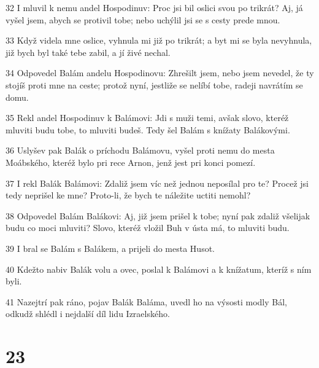 \par 32 I mluvil k nemu andel Hospodinuv: Proc jsi bil oslici svou po trikrát? Aj, já vyšel jsem, abych se protivil tobe; nebo uchýlil jsi se s cesty prede mnou.
\par 33 Když videla mne oslice, vyhnula mi již po trikrát; a byt mi se byla nevyhnula, již bych byl také tebe zabil, a jí živé nechal.
\par 34 Odpovedel Balám andelu Hospodinovu: Zhrešilt jsem, nebo jsem nevedel, že ty stojíš proti mne na ceste; protož nyní, jestliže se nelíbí tobe, radeji navrátím se domu.
\par 35 Rekl andel Hospodinuv k Balámovi: Jdi s muži temi, avšak slovo, kteréž mluviti budu tobe, to mluviti budeš. Tedy šel Balám s knížaty Balákovými.
\par 36 Uslyšev pak Balák o príchodu Balámovu, vyšel proti nemu do mesta Moábského, kteréž bylo pri rece Arnon, jenž jest pri konci pomezí.
\par 37 I rekl Balák Balámovi: Zdaliž jsem víc než jednou neposílal pro te? Procež jsi tedy neprišel ke mne? Proto-li, že bych te náležite uctiti nemohl?
\par 38 Odpovedel Balám Balákovi: Aj, již jsem prišel k tobe; nyní pak zdaliž všelijak budu co moci mluviti? Slovo, kteréž vložil Buh v ústa má, to mluviti budu.
\par 39 I bral se Balám s Balákem, a prijeli do mesta Husot.
\par 40 Kdežto nabiv Balák volu a ovec, poslal k Balámovi a k knížatum, kteríž s ním byli.
\par 41 Nazejtrí pak ráno, pojav Balák Baláma, uvedl ho na výsosti modly Bál, odkudž shlédl i nejdalší díl lidu Izraelského.

\chapter{23}

